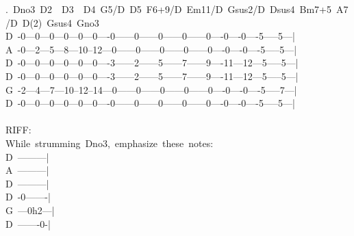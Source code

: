{.\ Dno3\ D2\ \ D3\ \ D4\ G5/D\ D5\ F6+9/D\ Em11/D\ Gsus2/D\ Dsus4\ Bm7+5\ A7/D\ D(2)\ Gsus4\ Gno3\\
D\ -0---0---0---0---0---0----0------0------0------0------0----0----0----5-----5---|\\
A\ -0---2---5---8---10--12---0------0------0------0------0----0----0----5-----5---|\\
D\ -0---0---0---0---0---0----3------2------5------7------9----11---12---5-----5---|\\
D\ -0---0---0---0---0---0----3------2------5------7------9----11---12---5-----5---|\\
G\ -2---4---7---10--12--14---0------0------0------0------0----0----0----5-----7---|\\
D\ -0---0---0---0---0---0----0------0------0------0------0----0----0----5-----5---|\\
\\
RIFF:\\
While\ strumming\ Dno3,\ emphasize\ these\ notes:\\
D\ ---------|\\
A\ ---------|\\
D\ ---------|\\
D\ -0-------|\\
G\ ---0h2---|\\
D\ -------0-|}
